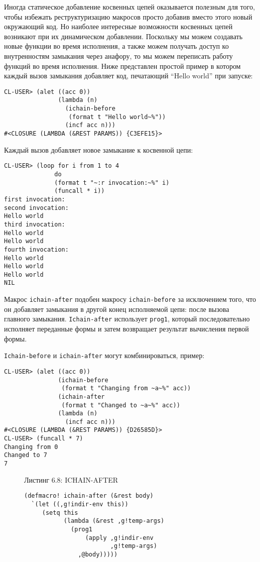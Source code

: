 Иногда статическое добавление косвенных цепей оказывается полезным для того, чтобы избежать реструктуризацию макросов просто добавив вместо этого новый окружающий код. Но наиболее интересные возможности косвенных цепей возникают при их динамическом добавлении. Поскольку мы можем создавать новые функции во время исполнения, а также можем получать доступ ко внутренностям замыкания через анафору, то мы можем переписать работу функций во время исполнения. Ниже представлен простой пример в котором каждый вызов замыкания добавляет код, печатающий ``Hello world'' при запуске:

\begin{verbatim}
CL-USER> (alet ((acc 0))
               (lambda (n)
                 (ichain-before
                  (format t "Hello world~%"))
                 (incf acc n)))
#<CLOSURE (LAMBDA (&REST PARAMS)) {C3EFE15}>
\end{verbatim}

Каждый вызов добавляет новое замыкание к косвенной цепи:

\begin{verbatim}
CL-USER> (loop for i from 1 to 4
              do
              (format t "~:r invocation:~%" i)
              (funcall * i))
first invocation:
second invocation:
Hello world
third invocation:
Hello world
Hello world
fourth invocation:
Hello world
Hello world
Hello world
NIL
\end{verbatim}

Макрос \verb"ichain-after" подобен макросу \verb"ichain-before" за исключением того, что он добавляет замыкания в другой конец исполняемой цепи: после вызова главного замыкания. \verb"Ichain-after" использует \verb"prog1", который последовательно исполняет переданные формы и затем возвращает результат вычисления первой формы.

\verb"Ichain-before" и \verb"ichain-after" могут комбинироваться, пример:

\begin{verbatim}
CL-USER> (alet ((acc 0))
               (ichain-before
                (format t "Changing from ~a~%" acc))
               (ichain-after
                (format t "Changed to ~a~%" acc))
               (lambda (n)
                 (incf acc n)))
#<CLOSURE (LAMBDA (&REST PARAMS)) {D26585D}>
CL-USER> (funcall * 7)
Changing from 0
Changed to 7
7
\end{verbatim}

\begin{figure}Листинг 6.8: ICHAIN-AFTER\label{listing_6.8}
\listbegin
\begin{verbatim}
(defmacro! ichain-after (&rest body)
  `(let ((,g!indir-env this))
     (setq this
           (lambda (&rest ,g!temp-args)
             (prog1
                 (apply ,g!indir-env
                        ,g!temp-args)
               ,@body)))))
\end{verbatim}
\listend
\end{figure}

